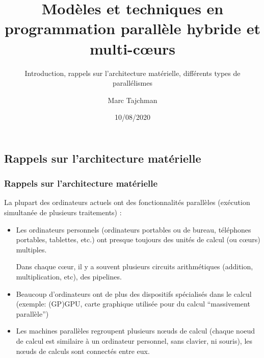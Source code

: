 \documentclass{beamer}
\title{Modèles et techniques en programmation parallèle hybride et multi-c\oe urs}
\subtitle{Introduction, rappels sur l'architecture matérielle, différents types de parallélismes}
\author{Marc Tajchman}\institute{CEA - DEN/DM2S/STMF/LMES}
\date{10/08/2020}
\begin{document}
\begin{frame}
\titlepage
\end{frame}

\large
\begin{frame}
\section{Rappels sur l'architecture mat\'erielle}
\frametitle{Rappels sur l'architecture mat\'erielle}

La plupart des ordinateurs actuels ont des fonctionnalités parallèles  (exécution simultanée de plusieurs traitements) : 

\begin{itemize}
	\item Les ordinateurs personnels (ordinateurs portables ou de bureau, téléphones portables, tablettes, etc.) ont presque toujours des unités de calcul (ou cœurs) multiples.
	
	Dans chaque cœur, il y a souvent plusieurs circuits arithmétiques (addition, multiplication, etc), des pipelines.
	
	\item Beaucoup d'ordinateurs ont de plus des dispositifs spécialisés dans le calcul (exemple: (GP)GPU, carte graphique utilisée pour du calcul ``massivement parallèle'')
	
	\item Les machines parallèles regroupent plusieurs nœuds de calcul (chaque noeud de calcul est similaire à un ordinateur personnel, sans clavier, ni souris), les nœuds de calculs sont connectés entre eux.
\end{itemize}
\end{frame}
\end{document}
